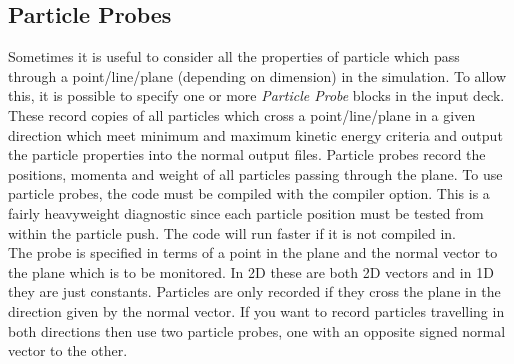 \subsection{Particle Probes}
Sometimes it is useful to consider all the properties of particle which pass
through a point/line/plane (depending on dimension) in the simulation. To
allow this, it is possible to specify one or more {\it Particle Probe} blocks
in the input deck. These record copies of all particles which cross a
point/line/plane in a given direction which meet minimum and maximum kinetic
energy criteria and output the particle properties into the normal output
files. Particle probes record the positions, momenta and weight of all
particles passing through the plane. To use particle probes, the code must be
compiled with the  compiler option. This is
a fairly heavyweight diagnostic since each particle position must be tested
from within the particle push. The code will run faster if it is not compiled
in.\\

The probe is specified in terms of a point in the plane and the normal
vector to the plane which is to be monitored. In 2D these are both 2D
vectors and in 1D they are just constants. Particles are only recorded
if they cross the plane in the direction given by the normal vector.
If you want to record particles travelling in both directions then use two
particle probes, one with an opposite signed normal vector to the other.

